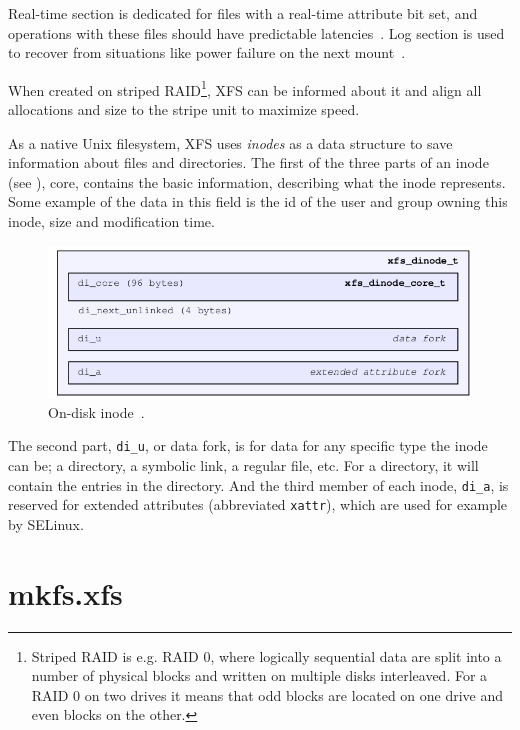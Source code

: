 Real-time section is dedicated for files with a real-time attribute bit set, and operations with these files should have predictable latencies~\cite{xfsRealtime}. Log section is used to recover from situations like power failure on the next mount~\cite{xfsStructure,xfsman}.

When created on striped RAID\footnote{Striped RAID is e.g. RAID 0, where logically sequential data are split into a number of physical blocks and written on multiple disks interleaved. For a RAID 0 on two drives it means that odd blocks are located on one drive and even blocks on the other.}, XFS can be informed about it and align all allocations and size to the stripe unit to maximize speed.

As a native Unix filesystem, XFS uses {\em inodes} as a data structure to save information about files and directories. The first of the three parts of an inode (see ), core, contains the basic information, describing what the inode represents. Some example of the data in this field is the id of the user and group owning this inode, size and modification time.

\begin{figure}
  \centering
 \includegraphics[width=12cm,keepaspectratio]{fig/inode} %
 \caption{On-disk inode~\cite[Ch. 4]{xfsStructure}.}
\label{fig:xfs:inode}
\end{figure}

The second part, {\tt di\_u}, or data fork, is for data for any specific type the inode can be; a directory, a symbolic link, a regular file, etc. For a directory, it will contain the entries in the directory. And the third member of each inode, {\tt di\_a}, is reserved for extended attributes (abbreviated {\tt xattr}), which are used for example by SELinux.

\section{mkfs.xfs}\label{chap:xfs:mkfs}

